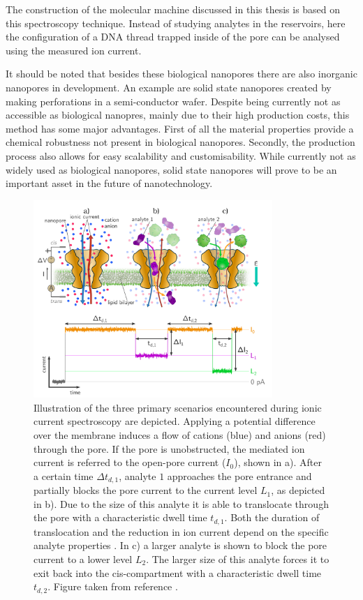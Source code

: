 The construction of the molecular machine discussed in this thesis is based on this
spectroscopy technique. Instead of studying analytes in the reservoirs, here
the configuration of a DNA thread trapped inside of the pore can be analysed using the
measured ion current.

It should be noted that besides these biological nanopores there are also inorganic
nanopores in development.\cite{Dekker2007} An example are solid state nanopores created
by making perforations in a semi-conductor wafer. Despite being currently not as
accessible as
biological nanopres, mainly due to their high production costs, this method has some
major advantages.  First of all the material properties provide a chemical robustness not
present in biological nanopores. Secondly, the production process also allows for easy
scalability
and customisability. While currently not as widely used as biological nanopores, solid
state nanopores will prove to be an important asset in the future of nanotechnology.

\begin{figure}[htpb!]
  \centering
  \includegraphics[width=0.72\linewidth, height=7.5cm]{Figures/IonicCurrentSpec2.png}
  \caption[Detailed illustration of ionic current spectroscopy.]{\linespread{0.1}
    {\linespread{0.1}\small  Illustration of the three primary scenarios encountered
      during ionic current
spectroscopy are depicted. Applying a potential difference over the membrane induces a
flow of cations (blue) and anions (red)
through the pore. If the pore is unobstructed, the mediated ion current is referred to
the open-pore current ($I_0$), shown in a). After a certain time $\Delta t_{d,1}$,
analyte $1$ approaches the pore entrance and partially blocks the pore current to the
current level $L_1$, as depicted in b). Due to the size of this analyte it is able to
translocate through the pore with a characteristic dwell time $t_{d,1}$. Both the
duration of translocation and the reduction in ion current depend on the
specific analyte properties . In c) a larger analyte is shown to block the pore current
to a lower level $L_2$. The larger size of this analyte forces it to exit back into the
cis-compartment with a characteristic dwell time $t_{d,2}$. Figure taken from reference
\cite{willems2021}.
}}
  \label{fig:IonicCurrentSpec}
\end{figure}





